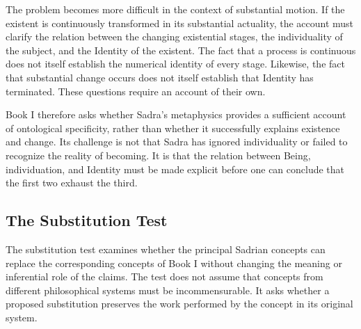 \label{para:VS.B01.P01.C08.S17.SS16.P004}

The problem becomes more
difficult in the context
of substantial motion.
If the existent is
continuously transformed
in its substantial
actuality, the account
must clarify the relation
between the changing
existential stages,
the individuality of
the subject, and the
Identity of the existent.
The fact that a process
is continuous does
not itself establish
the numerical identity
of every stage. Likewise,
the fact that substantial
change occurs does
not itself establish
that Identity has
terminated. These
questions require
an account of their
own.

\label{para:VS.B01.P01.C08.S17.SS16.P005}

Book I therefore asks
whether Sadra's metaphysics
provides a sufficient
account of ontological
specificity, rather than
whether it successfully
explains existence
and change. Its challenge
is not that Sadra has
ignored individuality
or failed to recognize
the reality of becoming.
It is that the relation
between Being, individuation,
and Identity must be
made explicit before
one can conclude that
the first two exhaust
the third.




\subsection{The Substitution Test}
\label{subsec:ch08_s17_ss17}

\label{para:VS.B01.P01.C08.S17.SS17.P001}

The substitution test examines
whether the principal
Sadrian concepts can
replace the corresponding
concepts of Book I
without changing the
meaning or inferential
role of the claims.
The test does not assume
that concepts from
different philosophical
systems must be
incommensurable. It
asks whether a proposed
substitution preserves
the work performed
by the concept in
its original system.

\label{para:VS.B01.P01.C08.S17.SS17.P002}

